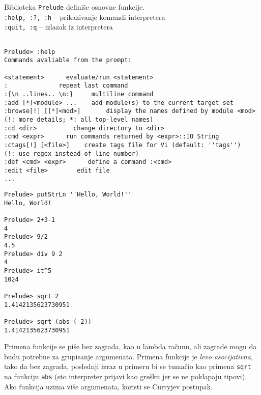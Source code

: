 \documentclass[../main.tex]{subfiles}
\begin{document}
\noindent Biblioteka \texttt{Prelude} definiše osnovne funkcije.\\
\texttt{:help, :?, :h} -- prikazivanje komandi interpretera \\
\texttt{:quit, :q} -- izlazak iz interpretera

\begin{boxprimer}
\begin{Verbatim}

Prelude> :help
Commands avaliable from the prompt:

<statement>		 evaluate/run <statement>
:			   repeat last command
:{\n ..lines.. \n:} 	multiline command
:add [*]<module> ...	add module(s) to the current target set
:browse[!] [[*]<mod>]       display the names defined by module <mod>
(!: more details; *: all top-level names)
:cd <dir>		   change directory to <dir>
:cmd <expr>		 run commands returned by <expr>::IO String
:ctags[!] [<file>]	  create tags file for Vi (default: ''tags'')
(!: use regex instead of line number)
:def <cmd> <expr>	   define a command :<cmd>
:edit <file>		edit file
...

\end{Verbatim}
\end{boxprimer}

\begin{multicols}{2}
\begin{boxprimer}%
\begin{Verbatim}
Prelude> putStrLn ''Hello, World!''
Hello, World!

Prelude> 2+3-1
4
Prelude> 9/2
4.5
Prelude> div 9 2
4
Prelude> it^5
1024

Prelude> sqrt 2			
1.4142135623730951

Prelude> sqrt (abs (-2))	
1.4142135623730951
\end{Verbatim}
\end{boxprimer}

\columnbreak

Primena funkcije se piše bez zagrada, kao u lambda računu, ali zagrade mogu da budu potrebne za grupisanje argumenata. Primena funkcije je {\it levo asocijativna}, tako da bez zagrada, poslednji izraz u primeru bi se tumačio kao primena \texttt{sqrt} na funkciju \texttt{abs} (sto interpreter prijavi kao grešku jer se ne poklapaju tipovi).
Ako funkcija uzima više argumenata, koristi se Curryjev postupak.

\end{multicols}
\end{document}
